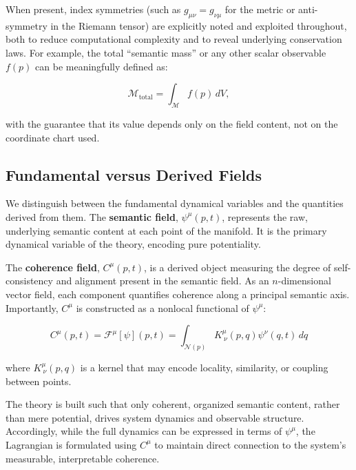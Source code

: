 When present, index symmetries (such as \(g_{\mu\nu} = g_{\nu\mu}\) for the metric or anti-symmetry in the Riemann tensor) are explicitly noted and exploited throughout, both to reduce computational complexity and to reveal underlying conservation laws. For example, the total “semantic mass” or any other scalar observable \(f(p)\) can be meaningfully defined as:

\begin{equation}
\mathcal{M}_{\text{total}} = \int_\mathcal{M} f(p) \, dV,
\end{equation}

with the guarantee that its value depends only on the field content, not on the coordinate chart used.



\subsection{Fundamental versus Derived Fields}
\label{2.4.6:fundamental_versus_derived_fields}

We distinguish between the fundamental dynamical variables and the quantities derived from them. The \textbf{semantic field}, \(\psi^\mu(p,t)\), represents the raw, underlying semantic content at each point of the manifold. It is the primary dynamical variable of the theory, encoding pure potentiality.

The \textbf{coherence field}, \(C^\mu(p,t)\), is a derived object measuring the degree of self-consistency and alignment present in the semantic field. As an \(n\)-dimensional vector field, each component quantifies coherence along a principal semantic axis. Importantly, \(C^\mu\) is constructed as a nonlocal functional of \(\psi^\mu\):

\begin{equation}
C^\mu(p,t) = \mathcal{F}^\mu[\psi](p,t) = \int_{\mathcal{N}(p)} K^\mu_{\ \nu}(p,q) \psi^\nu(q,t) \, dq
\end{equation}

where \(K^\mu_{\ \nu}(p,q)\) is a kernel that may encode locality, similarity, or coupling between points.

The theory is built such that only coherent, organized semantic content, rather than mere potential, drives system dynamics and observable structure. Accordingly, while the full dynamics can be expressed in terms of \(\psi^\mu\), the Lagrangian is formulated using \(C^\mu\) to maintain direct connection to the system's measurable, interpretable coherence.

